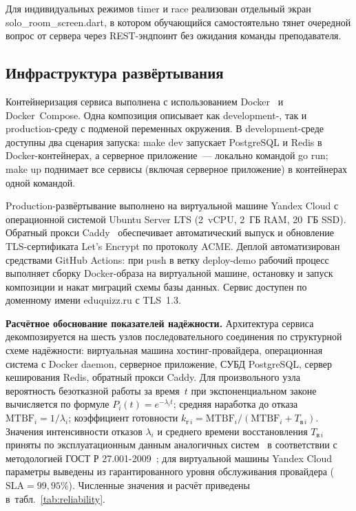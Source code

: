 Для индивидуальных режимов timer и race
реализован отдельный экран solo\_room\_screen.dart,
в котором обучающийся самостоятельно тянет очередной вопрос
от сервера через REST-эндпоинт без ожидания команды преподавателя.

\subsection{Инфраструктура развёртывания}

Контейнеризация сервиса выполнена с использованием
Docker~\cite{docker_docs} и Docker~Compose. Одна композиция
описывает как development-, так и production-среду с подменой
переменных окружения. В development-среде доступны два сценария
запуска: make dev запускает PostgreSQL и Redis
в Docker-контейнерах, а серверное приложение~--- локально
командой go run; make up поднимает все сервисы
(включая серверное приложение) в контейнерах одной командой.

Production-развёртывание выполнено на виртуальной машине Yandex
Cloud с операционной системой Ubuntu Server LTS (2~vCPU, 2~ГБ RAM,
20~ГБ SSD). Обратный прокси Caddy~\cite{caddy_docs} обеспечивает
автоматический выпуск и обновление TLS-сертификата Let's Encrypt
по протоколу ACME. Деплой автоматизирован средствами GitHub
Actions: при push в ветку deploy-demo рабочий процесс
выполняет сборку Docker-образа на виртуальной машине, остановку
и запуск композиции и накат миграций схемы базы данных. Сервис
доступен по доменному имени eduquizz.ru с TLS~1.3.

\textbf{Расчётное обоснование показателей надёжности.} Архитектура
сервиса декомпозируется на шесть узлов последовательного
соединения по структурной схеме надёжности: виртуальная машина
хостинг-провайдера, операционная система с Docker daemon,
серверное приложение, СУБД PostgreSQL, сервер кеширования Redis,
обратный прокси Caddy. Для произвольного узла вероятность
безотказной работы за время~$t$ при экспоненциальном законе
вычисляется по формуле $P_i(t) = e^{-\lambda_i t}$; средняя
наработка до отказа $\text{MTBF}_i = 1/\lambda_i$; коэффициент
готовности $k_{\text{г}\,i} = \text{MTBF}_i / (\text{MTBF}_i + T_{\text{в}\,i})$.
Значения интенсивности отказов $\lambda_i$ и среднего времени
восстановления $T_{\text{в}\,i}$ приняты по эксплуатационным
данным аналогичных систем~\cite[гл.~7]{ostreikovsky}
в соответствии с методологией ГОСТ Р 27.001-2009~\cite{gost27001};
для виртуальной машины Yandex Cloud параметры выведены из
гарантированного уровня обслуживания провайдера ($\mathrm{SLA} = 99{,}95\%$).
Численные значения и расчёт приведены в~табл.~\ref{tab:reliability}.

